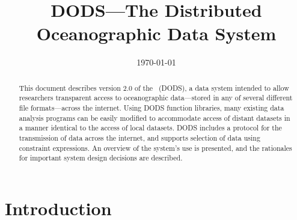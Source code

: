 %







\title{DODS---The Distributed Oceanographic Data System}
\author{}
\date{\today}

\maketitle

\begin{abstract}

  This document describes version 2.0 of the \DODS\ (DODS), a data
  system intended to allow researchers transparent access to
  oceanographic data---stored in any of several different file
  formats---across the internet. Using DODS function libraries, many
  existing data analysis programs can be easily modified to
  accommodate access of distant datasets in a manner identical to the
  access of local datasets. DODS includes a protocol for the
  transmission of data across the internet, and supports selection of
  data using constraint expressions. An overview of the system's use
  is presented, and the rationales for important system design
  decisions are described.

\end{abstract}
%
%
\begin{htmlonly}
\end{htmlonly}

\clearpage

\tableofcontents

\clearpage

\section{Introduction}

